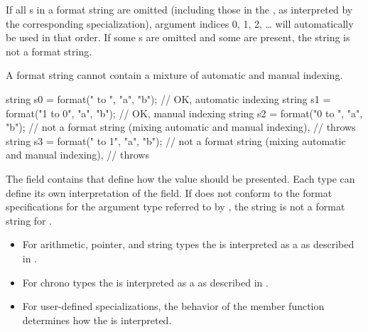 \pnum
If all s in a format string are omitted
(including those in the ,
as interpreted by the corresponding  specialization),
argument indices 0, 1, 2, \ldots{} will automatically be used in that order.
If some s are omitted and some are present,
the string is not a format string.
\begin{note}
A format string cannot contain a
mixture of automatic and manual indexing.
\end{note}
\begin{example}
\begin{codeblock}
string s0 = format("{} to {}",   "a", "b"); // OK, automatic indexing
string s1 = format("{1} to {0}", "a", "b"); // OK, manual indexing
string s2 = format("{0} to {}",  "a", "b"); // not a format string (mixing automatic and manual indexing),
                                            // throws 
string s3 = format("{} to {1}",  "a", "b"); // not a format string (mixing automatic and manual indexing),
                                            // throws 
\end{codeblock}
\end{example}

\pnum
The  field contains
that define how the value should be presented.
Each type can define its own
interpretation of the  field.
If  does not conform
to the format specifications for
the argument type referred to by ,
the string is not a format string for .
\begin{example}
\begin{itemize}
\item
For arithmetic, pointer, and string types
the 
is interpreted as a 
as described in .
\item
For chrono types
the 
is interpreted as a 
as described in .
\item
For user-defined  specializations,
the behavior of the  member function
determines how the 
is interpreted.
\end{itemize}
\end{example}

